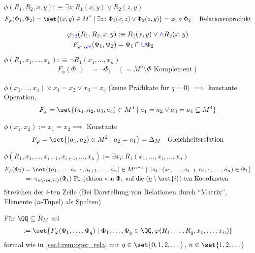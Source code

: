 \begin{example}
	\begin{expenum}
		\item $\phi(R_1, R_2, x,y) :\equiv \exists z \colon R_1(x,y) \vee R_2(z,y)$
		\begin{align*}
			F_{\phi}(\Phi_1,\Phi_2) = \set{(x,y) \in M^2 \mid \exists z \colon \Phi_1(x,z) \vee \Phi_2(z,y)} = \phi_1 \circ \Phi_2 \quad \text{ Relationenprodukt}
		\end{align*}
		\item \begin{align*}
			\varphi_{1\textcolor{blue}{2}}(R_1,R_2,x,y) &:\equiv R_1(x,y) \vee \textcolor{blue}{\wedge} R_2(x,y)\\
			F_{\varphi_1, \textcolor{blue}{\varphi_2}}(\Phi_1, \Phi_2) &= \Phi_1 \cap \textcolor{blue}{\cup} \Phi_2
		\end{align*}
		\item $\phi(R_1, x_1, \dots, x_n) :\equiv \neg R_1(x_1, \dots, x_n)$
		\begin{align*}
			F_{\phi}(\Phi_1)&=\neg \Phi_1 \quad (=M^n \setminus \Phi \text{ Komplement})
		\end{align*}
		\item $\phi(x_1, \dots, x_4) \vee x_1 = x_2 \vee x_3 = x_4$ (keine Prädikate für $q=0$) $\implies$ konstante Operation, 
		\begin{align*}
			F_{\phi} = \set{(a_1,a_2,a_3, a_4) \in M^4 \mid a_1 = a_2 \vee a_3 = a_4 \subseteq M^4}
		\end{align*}
		\item $\phi(x_1, x_2) := x_1 = x_2 \implies$ Konstante
		\begin{align*}
			F_{\phi} = \set{(a_1, a_2) \in M^2 \mid a_2 = a_1} = \Delta_M \quad \text{Gleichheitsrelation}
		\end{align*}
		\item $\phi(R_1, x_1, \dots, x_{i-1}, x_{i+1}, \dots, x_n) := \exists x_i \colon R_1(x_1, \dots, x_i, \dots, x_n)$
		\begin{align*}
			F_{\phi}(\Phi_1) &= \set{(a_1, \dots, a_{i-1}, a_{i+1},\dots, a_n) \in M^{n-1} \mid \exists a_i \colon (a_1, \dots, a_{i-1}, a_{i+1}, \dots, a_n) \in \Phi_1}\\
			&=: \pi_{n \setminus \set{i}}(\Phi_1) \text{ Projektion von $\Phi_1$ auf die $(\ul{n}\setminus \set{i})$-ten Koordinaten.}
		\end{align*}
		Streichen der $i$-ten Zeile (Bei Darstellung von Relationen durch ``Matrix'', Elemente ($n$-Tupel) als Spalten)
	\end{expenum}
\end{example}
\begin{definition}
	Für $\QQ \subseteq R_M$ sei
	\begin{align*}
		[\QQ] := \set{F_{\phi}(\Phi_1, \dots, \Phi_q)\mid \Phi_1, \dots, \Phi_q \in \QQ, \phi(R_1, \dots, R_q, x_1, \dots, x_n)}
	\end{align*}
	formal wie in \cref{sec4:rem:oper_rela} mit $q \in \set{0,1,2, \dots}$, $n \in \set{1,2,\dots}$
\end{definition}